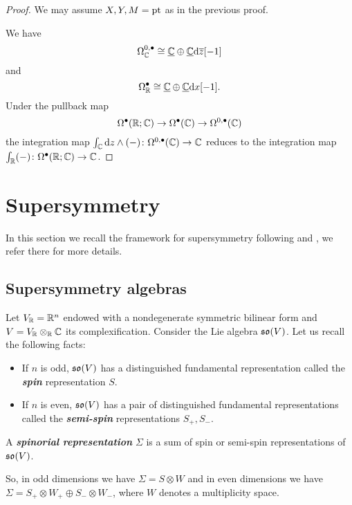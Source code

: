 \documentclass[10pt, oneside]{article}
\newcommand{\defterm}[1]{\textbf{\emph{#1}}}
\begin{document}
\begin{proof}
We may assume $X,Y,M=\operatorname{pt}$ as in the previous proof.

We have
\[\Omega^{0, \bullet}_{\mathbb C}\cong \underline{\mathbb C}\oplus \underline{\mathbb C}{\rm d} \overline{z}[-1]\]
and
\[\Omega^\bullet_{\mathbb R}\cong \underline{\mathbb C}\oplus \underline{\mathbb C} {\rm d} x[-1].\]
Under the pullback map
\[\Omega^\bullet(\mathbb R; \mathbb C)\rightarrow \Omega^\bullet(\mathbb C)\rightarrow \Omega^{0, \bullet}(\mathbb C)\]
the integration map $\int_\mathbb C {\rm d} z\wedge (-)\colon \Omega^{0, \bullet}(\mathbb C)\rightarrow \mathbb C$ reduces to the integration map $\int_\mathbb R (-)\colon \Omega^{\bullet}(\mathbb R;\mathbb C)\rightarrow \mathbb C$.
\end{proof}

\section{Supersymmetry} \label{sec: susy}

In this section we recall the framework for supersymmetry following \cite{ElliottSafronov} and \cite{DeligneSpinors}, we refer there for more details.

\subsection{Supersymmetry algebras}

Let $V_\mathbb R = \mathbb R^n$ endowed with a nondegenerate symmetric bilinear form and $V=V_\mathbb R\otimes_\mathbb R\mathbb C$ its complexification. Consider the Lie algebra $\mathfrak{so}(V)$. Let us recall the following facts:
\begin{itemize}
\item If $n$ is odd, $\mathfrak{so}(V)$ has a distinguished fundamental representation called the \defterm{spin} representation $S$.

\item If $n$ is even, $\mathfrak{so}(V)$ has a pair of distinguished fundamental representations called the \defterm{semi-spin} representations $S_+, S_-$.
\end{itemize}

\begin{definition}
A \defterm{spinorial representation} $\Sigma$ is a sum of spin or semi-spin representations of $\mathfrak{so}(V)$.
\end{definition}

So, in odd dimensions we have $\Sigma=S\otimes W$ and in even dimensions we have $\Sigma=S_+\otimes W_+\oplus S_-\otimes W_-$, where $W$ denotes a multiplicity space.
\end{document}
